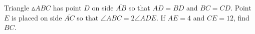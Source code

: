 Triangle $\vartriangle ABC$ has point $D$ on side $\overline{AB}$ so that $AD = BD$ and $BC = CD$. Point $E$ is placed on side $\overline{AC}$ so that $\angle ABC = 2\angle ADE$. If $AE = 4$ and $CE = 12$, find $BC$.
